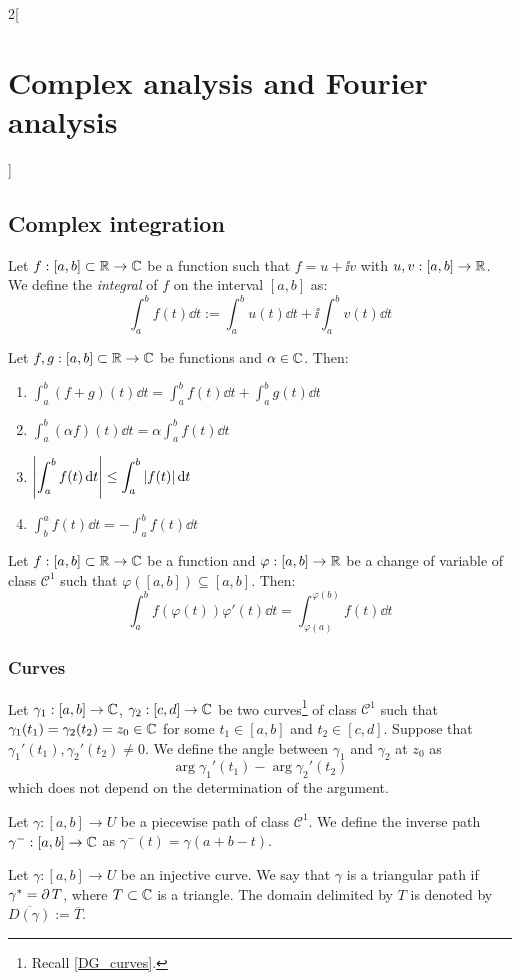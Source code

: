 \documentclass[../../../main.tex]{subfiles}
\begin{document}
\begin{multicols}{2}[\section{Complex analysis and Fourier analysis}]
  \subsection{Complex integration}
  \begin{definition}
    Let $f:[a,b]\subset\mathbb{R}\rightarrow\mathbb{C}$ be a function such that $f=u+\ii v$ with $u,v:[a,b]\rightarrow\mathbb{R}$. We define the \emph{integral} of $f$ on the interval $[a,b]$ as: $$\int_a^bf(t)\dd{t}:=\int_a^bu(t)\dd{t}+\ii\int_a^bv(t)\dd{t}$$
  \end{definition}
  \begin{proposition}
    Let $f,g:[a,b]\subset\mathbb{R}\rightarrow\mathbb{C}$ be functions and $\alpha\in\mathbb{C}$. Then:
    \begin{enumerate}
      \item $\displaystyle\int_a^b(f+g)(t)\dd{t}=\int_a^bf(t)\dd{t}+\int_a^bg(t)\dd{t}$
      \item $\displaystyle\int_a^b(\alpha f)(t)\dd{t}=\alpha \int_a^bf(t)\dd{t}$
      \item $\displaystyle\abs{\int_a^bf(t)\dd{t}}\leq\int_a^b|f(t)|\dd{t}$
      \item $\displaystyle \int_b^af(t)\dd{t}=-\int_a^bf(t)\dd{t}$
    \end{enumerate}
  \end{proposition}
  \begin{proposition}
    Let $f:[a,b]\subset\mathbb{R}\rightarrow\mathbb{C}$ be a function and $\varphi:[a,b]\rightarrow\mathbb{R}$ be a change of variable of class $\mathcal{C}^1$ such that $\varphi([a,b])\subseteq[a,b]$. Then: $$\int_a^bf(\varphi(t))\varphi'(t)\dd{t}=\int_{\varphi(a)}^{\varphi(b)}f(t)\dd{t}$$
  \end{proposition}
  \subsubsection{Curves}
  \begin{definition}
    Let $\gamma_1:[a,b]\rightarrow\mathbb{C}$, $\gamma_2:[c,d]\rightarrow\mathbb{C}$ be two curves\footnote{Recall \cref{DG_curves}.} of class $\mathcal{C}^1$ such that $\gamma_1(t_1)=\gamma_2(t_2)=z_0\in\mathbb{C}$ for some $t_1\in[a,b]$ and $t_2\in[c,d]$. Suppose that ${\gamma_1}'(t_1),{\gamma_2}'(t_2)\ne 0$. We define the angle between $\gamma_1$ and $\gamma_2$ at $z_0$ as $$\arg{\gamma_1}'(t_1)-\arg{\gamma_2}'(t_2)$$ which does not depend on the determination of the argument.
  \end{definition}
  \begin{definition}
    Let $\gamma:[a,b]\rightarrow U$ be a piecewise path of class $\mathcal{C}^1$. We define the inverse path $\gamma^-:[a,b]\rightarrow\mathbb{C}$ as $\gamma^-(t)=\gamma(a+b-t)$.
  \end{definition}
  \begin{definition}
    Let $\gamma:[a,b]\rightarrow U$ be an injective curve. We say that $\gamma$ is a triangular path if $\gamma^*=\operatorname{\partial} T$, where $T\subset\mathbb{C}$ is a triangle. The domain delimited by $T$ is denoted by $\overline{D(\gamma)}:=\overline{T}$.
  \end{definition}

\end{multicols}
\end{document}
